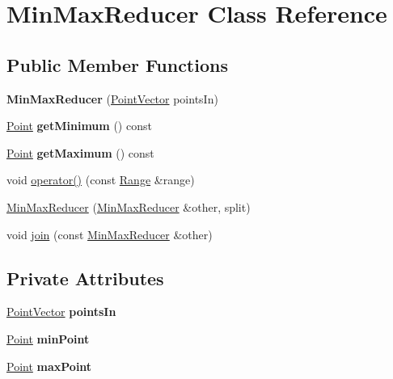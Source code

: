 \hypertarget{class_min_max_reducer}{
\section{MinMaxReducer Class Reference}
\label{class_min_max_reducer}
}
\subsection*{Public Member Functions}
\begin{CompactItemize}
\item 
\hypertarget{class_min_max_reducer_21bb0b674efa16fe293f02e7ddac5baa}{
\textbf{MinMaxReducer} (\hyperlink{class_point}{PointVector} pointsIn)}
\label{class_min_max_reducer_21bb0b674efa16fe293f02e7ddac5baa}

\item 
\hypertarget{class_min_max_reducer_16c5224355e8fde2e50a8189fca1c2b5}{
\hyperlink{class_point}{Point} \textbf{getMinimum} () const }
\label{class_min_max_reducer_16c5224355e8fde2e50a8189fca1c2b5}

\item 
\hypertarget{class_min_max_reducer_af59d922da8dd11500e068f86e9e140a}{
\hyperlink{class_point}{Point} \textbf{getMaximum} () const }
\label{class_min_max_reducer_af59d922da8dd11500e068f86e9e140a}

\item 
void \hyperlink{class_min_max_reducer_966e6358c637bb3c663a3b6547170fd4}{operator()} (const \hyperlink{cowichan__tbb_8hpp_8e2057f725b08f3a15513c378a453a47}{Range} \&range)
\item 
\hyperlink{class_min_max_reducer_282eda515485b150389c963f1024ce12}{MinMaxReducer} (\hyperlink{class_min_max_reducer}{MinMaxReducer} \&other, split)
\item 
void \hyperlink{class_min_max_reducer_d002be90fb5c5e273b9f0d5fcb1db988}{join} (const \hyperlink{class_min_max_reducer}{MinMaxReducer} \&other)
\end{CompactItemize}
\subsection*{Private Attributes}
\begin{CompactItemize}
\item 
\hypertarget{class_min_max_reducer_850a77d5dc5ed32204e265cfc619abc2}{
\hyperlink{class_point}{PointVector} \textbf{pointsIn}}
\label{class_min_max_reducer_850a77d5dc5ed32204e265cfc619abc2}

\item 
\hypertarget{class_min_max_reducer_615c82d310905e78ae116be676357c46}{
\hyperlink{class_point}{Point} \textbf{minPoint}}
\label{class_min_max_reducer_615c82d310905e78ae116be676357c46}

\item 
\hypertarget{class_min_max_reducer_e096e17b34d0bc699a3ed349ed5798d8}{
\hyperlink{class_point}{Point} \textbf{maxPoint}}
\label{class_min_max_reducer_e096e17b34d0bc699a3ed349ed5798d8}

\end{CompactItemize}


